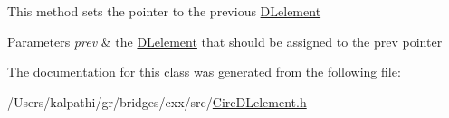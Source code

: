 This method sets the pointer to the previous \mbox{\hyperlink{classbridges_1_1datastructure_1_1_d_lelement}{D\+Lelement}} 
\begin{DoxyParams}{Parameters}
{\em prev} & the \mbox{\hyperlink{classbridges_1_1datastructure_1_1_d_lelement}{D\+Lelement}} that should be assigned to the prev pointer \\
\hline
\end{DoxyParams}


The documentation for this class was generated from the following file\+:\begin{DoxyCompactItemize}
\item 
/\+Users/kalpathi/gr/bridges/cxx/src/\mbox{\hyperlink{_circ_d_lelement_8h}{Circ\+D\+Lelement.\+h}}\end{DoxyCompactItemize}
